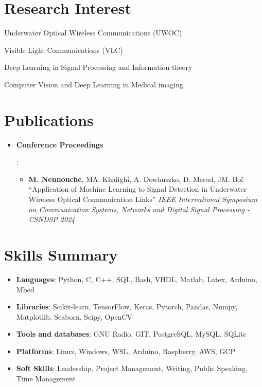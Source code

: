\documentclass[a4paper,20pt]{article}
\newcommand{\resumeItem}[2]{
  \item\small{
    \textbf{#1}{: #2 \vspace{-2pt}}
  }
}
\newcommand{\resumeSubItem}[2]{\resumeItem{#1}{#2}\vspace{-3pt}}
\newcommand{\resumeSubHeadingListStart}{\begin{itemize}[leftmargin=*]}
\newcommand{\resumeSubHeadingListEnd}{\end{itemize}}
\begin{document}
\vspace{-5pt}
\section{Research Interest}
\begin{description}[font=$\bullet$]
  \item{Underwater Optical Wireless Communications (UWOC)}
  \item{Visible Light Communications (VLC)}
  \item{Deep Learning in Signal Processing and Information theory}
  \item{Computer Vision and Deep Learning in Medical imaging}
\end{description}

\vspace{-5pt}
\section{Publications}
  \resumeSubHeadingListStart
  \resumeSubItem{Conference Proceedings}{
    \begin{itemize}
      \item \textbf{M. Nennouche}, MA. Khalighi, A. Dowhuszko, D. Merad, JM. Boï ``Application of Machine Learning to Signal Detection in Underwater Wireless Optical Communication Links'' \textit{IEEE International Symposium on Communication Systems, Networks and Digital Signal Processing - CSNDSP 2024}
    \end{itemize}
  }
  \resumeSubHeadingListEnd

\vspace{-5pt}
\section{Skills Summary}
	\resumeSubHeadingListStart
    \resumeSubItem{Languages}{Python, C, C++, SQL, Bash, VHDL, Matlab, Latex, Arduino, Mbed} %
    \resumeSubItem{Libraries}{Scikit-learn, TensorFlow, Keras, Pytorch, Pandas, Numpy, Matplotlib, Seaborn, Scipy, OpenCV} %
    \resumeSubItem{Tools and databases}{GNU Radio, GIT, PostgreSQL, MySQL, SQLite} %
    \resumeSubItem{Platforms}{Linux, Windows, WSL, Arduino, Raspberry, AWS, GCP}
    \resumeSubItem{Soft Skills}{Leadership, Project Management, Writing, Public Speaking, Time Management}
  \resumeSubHeadingListEnd
\end{document}
